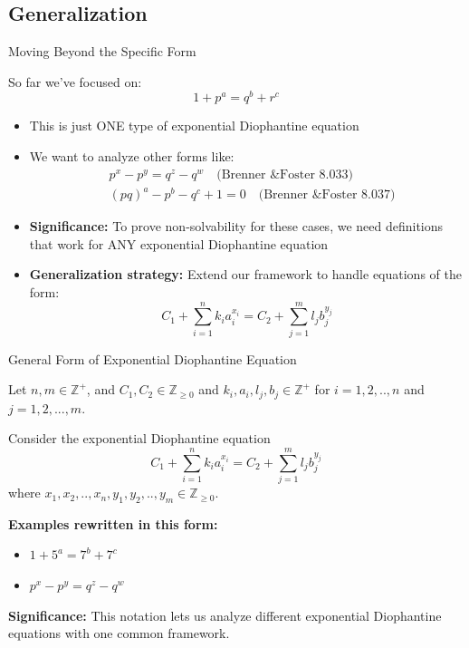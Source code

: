 \subsection{Generalization}

\begin{frame}{Moving Beyond the Specific Form}
    \begin{block}{So far we've focused on:}
        \[1+p^a = q^b + r^c\]
    \end{block}

    \begin{itemize}
        \item This is just ONE type of exponential Diophantine equation
        \item We want to analyze other forms like:
        \begin{align*}
            &p^x - p^y = q^z - q^w \quad \text{(Brenner \& Foster 8.033)}\\
            &(pq)^a - p^b - q^c + 1 = 0 \quad \text{(Brenner \& Foster 8.037)}
        \end{align*}

        \item \textbf{Significance:} To prove non-solvability for these cases, we need definitions that work for ANY exponential Diophantine equation

        \item \textbf{Generalization strategy:} Extend our framework to handle equations of the form:
        \[C_1 + \sum_{i=1}^n k_i a_i^{x_i} = C_2 + \sum_{j=1}^m l_j b_j^{y_j}\]
    \end{itemize}
\end{frame}

\begin{frame}{General Form of Exponential Diophantine Equation}
    \begin{definition}
        Let $n,m \in \mathbb{Z}^{+}$, and $C_1, C_2 \in \mathbb{Z}_{\geq 0}$ and $k_i, a_i, l_j, b_j \in \mathbb{Z}^{+}$ for $i=1,2,..,n$ and $j=1,2,...,m$.

        Consider the exponential Diophantine equation
        \begin{equation}
            C_1 + \sum_{i=1}^n k_i a_i^{x_i} = C_2 + \sum_{j=1}^m l_j b_j^{y_j} \label{general}
        \end{equation}
        where $x_1,x_2,..,x_n, y_1,y_2,..,y_m \in \mathbb{Z}_{\geq 0}$.
    \end{definition}

    \textbf{Examples rewritten in this form:}
    \begin{itemize}
        \item $1 + 5^a = 7^b + 7^c$
        \item $p^x - p^y = q^z - q^w$
    \end{itemize}

    \textbf{Significance:} This notation lets us analyze different exponential Diophantine equations with one common framework.
\end{frame}

